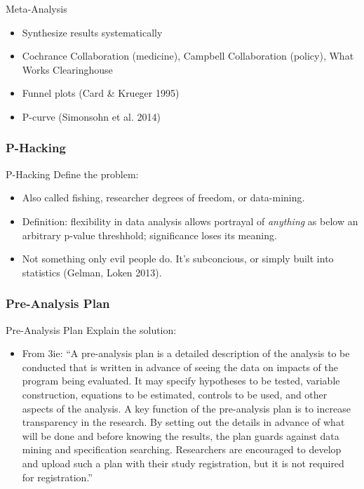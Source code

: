 \documentclass{beamer}
\begin{document}
\begin{frame}{Meta-Analysis}
\begin{itemize}
\item Synthesize results systematically
\item Cochrance Collaboration (medicine), Campbell Collaboration (policy), What Works Clearinghouse
\item Funnel plots (Card \& Krueger 1995)
\item P-curve (Simonsohn et al. 2014)
\end{itemize}
\end{frame}
\subsubsection*{P-Hacking}
\begin{frame}[<.->]{P-Hacking}
Define the problem:
\begin{itemize}
\item
Also called fishing, researcher degrees of freedom, or data-mining.
\item
Definition: flexibility in data analysis allows portrayal of \textit{anything} as below an arbitrary p-value threshhold; significance loses its meaning.
\item
Not something only evil people do. It's subconcious, or simply built into statistics (Gelman, Loken 2013).
\end{itemize}
\end{frame}

\subsubsection*{Pre-Analysis Plan}
\begin{frame}{Pre-Analysis Plan}
Explain the solution:
\begin{itemize}
\item
From 3ie: ``A pre-analysis plan is a detailed description of the analysis to be conducted that is written in advance of seeing the data on impacts of the program being evaluated. It may specify hypotheses to be tested, variable construction, equations to be estimated, controls to be used, and other aspects of the analysis. A key function of the pre-analysis plan is to increase transparency in the research. By setting out the details in advance of what will be done and before knowing the results, the plan guards against data mining and specification searching. Researchers are encouraged to develop and upload such a plan with their study registration, but it is not required for registration.''
\end{itemize}
\end{frame}
\end{document}
